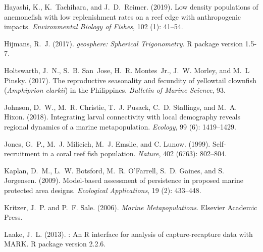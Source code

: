 \documentclass[12pt, oneside]{article}   	%
\begin{document}
\begin{thebibliography}{66}
Hayashi, K., K.~Tachihara, and J.~D.~Reimer. (2019).
\newblock Low density populations of anemonefish with low replenishment rates
  on a reef edge with anthropogenic impacts.
\newblock \emph{Environmental Biology of Fishes}, 102 (1):
  41--54.

Hijmans, R.~J. (2017).
\newblock \emph{geosphere: Spherical Trigonometry}.
\newblock R package version 1.5-7.

Holtswarth, J.~N., S.~B. San~Jose, H.~R. Montes~Jr., J.~W.
  Morley, and M.~L Pinsky. (2017).
\newblock The reproductive seasonality and fecundity of yellowtail clownfish
  (\textit{Amphiprion clarkii}) in the Philippines.
\newblock \emph{Bulletin of Marine Science}, 93.

Johnson, D.~W., M.~R. Christie, T.~J. Pusack, C.~D. Stallings,
  and M.~A. Hixon. (2018).
\newblock Integrating larval connectivity with local demography reveals
  regional dynamics of a marine metapopulation.
\newblock \emph{Ecology}, 99 (6): 1419--1429.

Jones, G.~P., M.~J. Milicich, M.~J. Emslie, and C. Lunow. (1999).
\newblock Self-recruitment in a coral reef fish population.
\newblock \emph{Nature}, 402 (6763): 802--804.

Kaplan, D.~M., L.~W. Botsford, M.~R. O'Farrell, S.~D. Gaines, and
  S. Jorgensen. (2009).
\newblock Model-based assessment of persistence in proposed marine protected
  area designs.
\newblock \emph{Ecological Applications}, 19 (2): 433--448.

Kritzer, J.~P. and P.~F. Sale. (2006).
\newblock \emph{Marine Metapopulations}.
\newblock Elsevier Academic Press.

Laake, J.~L. (2013).
: An R interface for analysis of capture-recapture data with
  {MARK}.
\newblock R package version 2.2.6.


\end{thebibliography}
\end{document}
